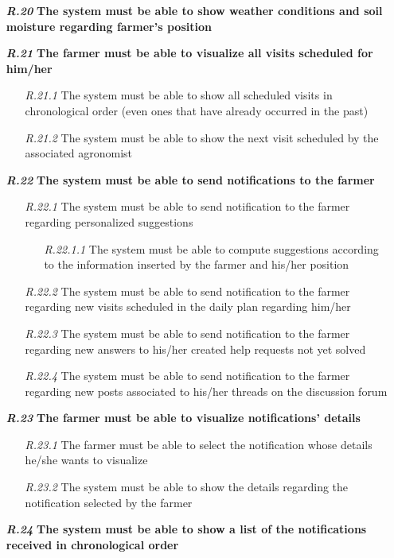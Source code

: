 \begin{itemize}
        \item [\textbf{\textit{R.20}}] \textbf{The system must be able to show weather conditions and soil moisture regarding farmer’s position}
        \item [\textbf{\textit{R.21}}] \textbf{The farmer must be able to visualize all visits scheduled for him/her}
        \begin{itemize}
            \item [\textit{R.21.1}] The system must be able to show all scheduled visits in chronological order (even ones that have already occurred in the past)
             \item [\textit{R.21.2}] The system must be able to show the next visit scheduled by the associated agronomist
        \end{itemize}
        \item [\textbf{\textit{R.22}}] \textbf{The system must be able to send notifications to the farmer}
        \begin{itemize}
            \item [\textit{R.22.1}] The system must be able to send notification to the farmer regarding personalized suggestions
        \begin{itemize}
            \item [\textit{R.22.1.1}] The system must be able to compute suggestions according to the information inserted by the farmer and his/her position
        \end{itemize}
            \item [\textit{R.22.2}] The system must be able to send notification to the farmer regarding new visits scheduled in the daily plan regarding him/her
            \item [\textit{R.22.3}] The system must be able to send notification to the farmer regarding new answers to his/her created help requests not yet solved
            \item [\textit{R.22.4}] The system must be able to send notification to the farmer regarding new posts associated to his/her threads on the discussion forum
        \end{itemize}
        \item [\textbf{\textit{R.23}}] \textbf{The farmer must be able to visualize notifications’ details}
        \begin{itemize}
            \item [\textit{R.23.1}] The farmer must be able to select the notification whose details he/she wants to visualize
            \item [\textit{R.23.2}] The system must be able to show the details regarding the notification selected by the farmer
        \end{itemize}
        \item [\textbf{\textit{R.24}}] \textbf{The system must be able to show a list of the notifications received in chronological order}





\end{itemize}
